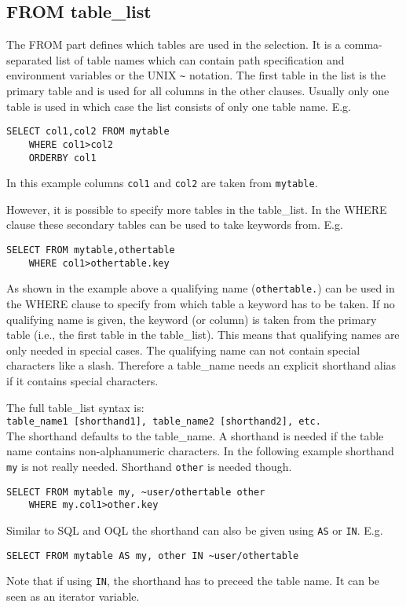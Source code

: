 \subsection{\label{TAQL:TABLE_LIST}FROM table\_list}
The FROM part defines which tables are used in the selection.
It is a comma-separated list of table names which can contain
path specification and environment variables or the UNIX
\verb+~+ notation.
The first table in the list is the primary
table and is used for all columns in the other clauses.
Usually only one table is used in which case the list consists
of only one table name. E.g.
\begin{verbatim}
SELECT col1,col2 FROM mytable
    WHERE col1>col2
    ORDERBY col1
\end{verbatim}
In this example columns \texttt{col1} and \texttt{col2}
are taken from \texttt{mytable}.

However, it is possible to specify more tables in the table\_list.
In the WHERE clause these secondary tables can be used to take
keywords from. E.g.
\begin{verbatim}
SELECT FROM mytable,othertable
    WHERE col1>othertable.key
\end{verbatim}
As shown in the example above a qualifying name (\verb+othertable.+)
can be used in the WHERE
clause to specify from which table a keyword has to be taken.
If no qualifying name is given, the keyword (or column) is taken
from the primary table (i.e., the first table in the table\_list).
This means that qualifying names are only needed in special cases.
The qualifying name can not contain special characters like a slash.
Therefore a table\_name needs an explicit shorthand alias
if it contains special characters.

The full table\_list syntax is:
\\
\texttt{table\_name1 [shorthand1], table\_name2 [shorthand2], etc.}
\\The shorthand defaults to the table\_name. A shorthand is needed if
the table name contains non-alphanumeric characters.
In the following example shorthand \texttt{my} is not really needed.
Shorthand \texttt{other} is needed though.
\begin{verbatim}
SELECT FROM mytable my, ~user/othertable other
    WHERE my.col1>other.key
\end{verbatim}
Similar to SQL and OQL the shorthand can also be given using
\texttt{AS} or \texttt{IN}. E.g.
\begin{verbatim}
SELECT FROM mytable AS my, other IN ~user/othertable
\end{verbatim}
Note that if using \texttt{IN}, the shorthand has to preceed
the table name. It can be seen as an iterator variable.

